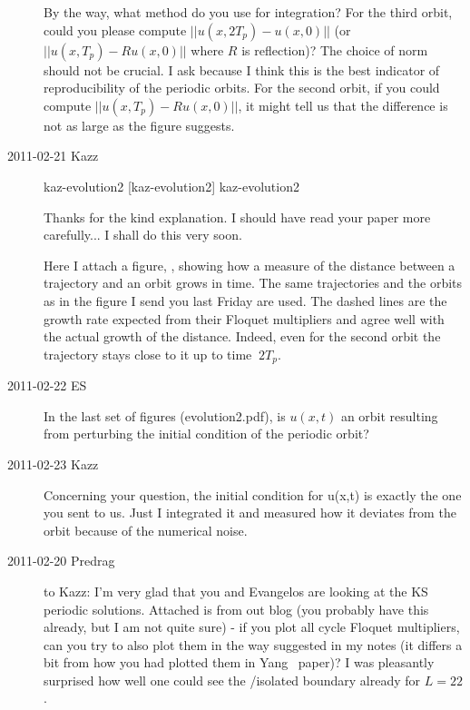 \begin{description}
  By the way, what method do you use for integration? For the third
  orbit, could you please compute $||u(x,2T_p)-u(x,0)||$ (or
  $||u(x,T_p)-Ru(x,0)||$ where $R$ is reflection)? The choice of norm should
  not be crucial. I ask because I think this is the best indicator of
  reproducibility of the periodic orbits. For the second orbit, if you
  could compute $||u(x,T_p)-Ru(x,0)||$, it might tell us that the
  difference is not as large as the figure suggests.

\item[2011-02-21 Kazz]

  {kaz-evolution2}   %
  {}   %
  {    %
    {\po}  [kaz-evolution2]
  }
  {kaz-evolution2}   %


  Thanks for the kind explanation. I should have read your
  paper more carefully... I shall do this very soon.

  Here I attach a figure, , showing
  how a measure of the distance between a
  trajectory and an orbit grows in time. The same trajectories and the orbits
  as in the figure I send you last Friday are used. The dashed lines are the
  growth rate expected from their Floquet multipliers and agree well with the
  actual growth of the distance. Indeed, even for the second orbit the trajectory
  stays close to it up to time $~2T_p$.

\item[2011-02-22 ES] In the last set of figures (evolution2.pdf), is $u(x,t)$
  an orbit resulting from perturbing the initial condition of the periodic orbit?

\item[2011-02-23 Kazz] Concerning your question, the initial condition for u(x,t)
  is exactly the one you sent to us. Just I integrated it and measured how
  it deviates from the orbit because of the numerical noise.


\item[2011-02-20 Predrag] to Kazz:
  I'm very glad that you and Evangelos are looking at the KS periodic solutions.
  Attached is  from out blog
  (you probably have this already, but
  I am not quite sure) - if you plot all cycle Floquet multipliers, can you try to
  also plot them in the way suggested in my notes (it differs a bit from how you
  had plotted them in Yang \etal\ paper)?
  I was pleasantly surprised how well one
  could see the {\entangled}/isolated boundary already for $L=22$.



\end{description}
